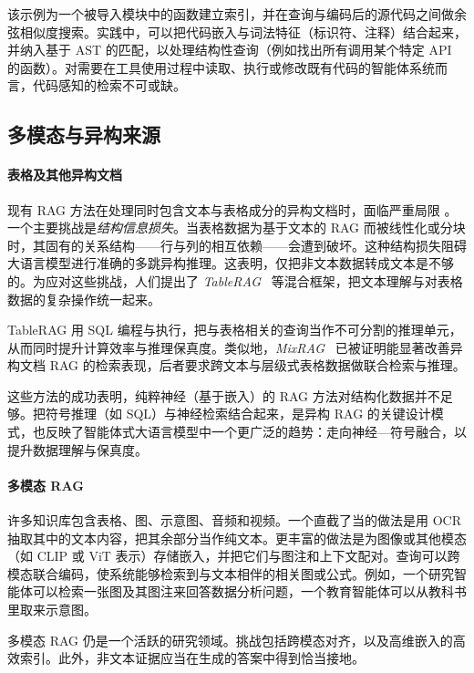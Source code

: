 该示例为一个被导入模块中的函数建立索引，并在查询与编码后的源代码之间做余弦相似度搜索。实践中，可以把代码嵌入与词法特征（标识符、注释）结合起来，并纳入基于 AST 的匹配，以处理结构性查询（例如找出所有调用某个特定 API 的函数）。对需要在工具使用过程中读取、执行或修改既有代码的智能体系统而言，代码感知的检索不可或缺。


\subsection{多模态与异构来源}

\paragraph{表格及其他异构文档} 现有 RAG 方法在处理同时包含文本与表格成分的异构文档时，面临严重局限 \citep{yu2025tableragretrievalaugmentedgeneration}。一个主要挑战是\textit{结构信息损失}。当表格数据为基于文本的 RAG 而被线性化或分块时，其固有的关系结构——行与列的相互依赖——会遭到破坏。这种结构损失阻碍大语言模型进行准确的多跳异构推理。这表明，仅把非文本数据转成文本是不够的。为应对这些挑战，人们提出了 \emph{TableRAG}~\citep{yu2025tableragretrievalaugmentedgeneration} 等混合框架，把文本理解与对表格数据的复杂操作统一起来。

TableRAG 用 SQL 编程与执行，把与表格相关的查询当作不可分割的推理单元，从而同时提升计算效率与推理保真度。类似地，\emph{MixRAG}~\citep{zhang2025mixtureofragintegratingtexttables} 已被证明能显著改善异构文档 RAG 的检索表现，后者要求跨文本与层级式表格数据做联合检索与推理。

这些方法的成功表明，纯粹神经（基于嵌入）的 RAG 方法对结构化数据并不足够。把符号推理（如 SQL）与神经检索结合起来，是异构 RAG 的关键设计模式，也反映了智能体式大语言模型中一个更广泛的趋势：走向神经—符号融合，以提升数据理解与保真度。

\paragraph{多模态 RAG}  许多知识库包含表格、图、示意图、音频和视频。一个直截了当的做法是用 OCR 抽取其中的文本内容，把其余部分当作纯文本。更丰富的做法是为图像或其他模态（如 CLIP 或 ViT 表示）存储嵌入，并把它们与图注和上下文配对。查询可以跨模态联合编码，使系统能够检索到与文本相伴的相关图或公式。例如，一个研究智能体可以检索一张图及其图注来回答数据分析问题，一个教育智能体可以从教科书里取来示意图。

多模态 RAG 仍是一个活跃的研究领域。挑战包括跨模态对齐，以及高维嵌入的高效索引。此外，非文本证据应当在生成的答案中得到恰当接地。


